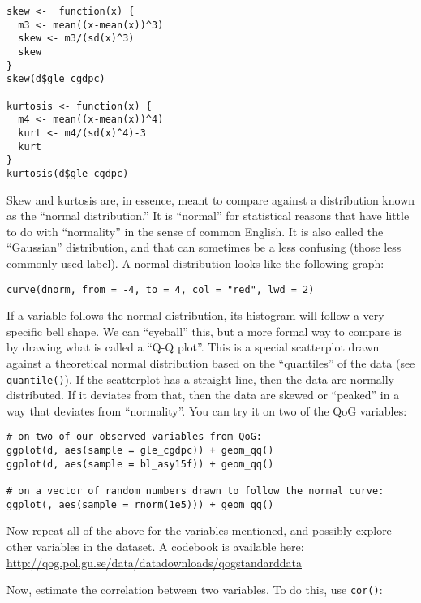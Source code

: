 \documentclass[a4paper,12pt]{article}
\begin{document}
\begin{enumerate*}
\begin{verbatim}
skew <-  function(x) {
  m3 <- mean((x-mean(x))^3)
  skew <- m3/(sd(x)^3)
  skew
}
skew(d$gle_cgdpc)

kurtosis <- function(x) {  
  m4 <- mean((x-mean(x))^4) 
  kurt <- m4/(sd(x)^4)-3  
  kurt
}
kurtosis(d$gle_cgdpc)
\end{verbatim}

\item Skew and kurtosis are, in essence, meant to compare against a distribution known as the ``normal distribution.'' It is ``normal'' for statistical reasons that have little to do with ``normality'' in the sense of common English. It is also called the ``Gaussian'' distribution, and that can sometimes be a less confusing (those less commonly used label). A normal distribution looks like the following graph:

\begin{verbatim}
curve(dnorm, from = -4, to = 4, col = "red", lwd = 2)
\end{verbatim}


If a variable follows the normal distribution, its histogram will follow a very specific bell shape. We can ``eyeball'' this, but a more formal way to compare is by drawing what is called a ``Q-Q plot''. This is a special scatterplot drawn against a theoretical normal distribution based on the ``quantiles'' of the data (see \texttt{quantile()}). If the scatterplot has a straight line, then the data are normally distributed. If it deviates from that, then the data are skewed or ``peaked'' in a way that deviates from ``normality''. You can try it on two of the QoG variables:

\begin{verbatim}
# on two of our observed variables from QoG:
ggplot(d, aes(sample = gle_cgdpc)) + geom_qq()
ggplot(d, aes(sample = bl_asy15f)) + geom_qq()

# on a vector of random numbers drawn to follow the normal curve:
ggplot(, aes(sample = rnorm(1e5))) + geom_qq()
\end{verbatim}

\item Now repeat all of the above for the variables mentioned, and possibly explore other variables in the dataset. A codebook is available here: \url{http://qog.pol.gu.se/data/datadownloads/qogstandarddata}

\item Now, estimate the correlation between two variables. To do this, use \texttt{cor()}:


\end{enumerate*}
\end{document}
